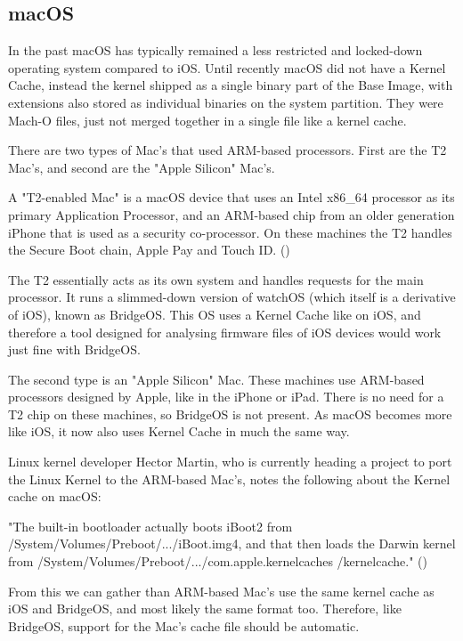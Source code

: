 \subsection{macOS}


In the past macOS has typically remained a less restricted and locked-down operating system compared to iOS. Until recently macOS did not have a Kernel Cache, instead the kernel shipped as a single binary part of the Base Image, with extensions also stored as individual binaries on the system partition. They were Mach-O files, just not merged together in a single file like a kernel cache.


There are two types of Mac's that used ARM-based processors. First are the T2 Mac's, and second are the "Apple Silicon" Mac's.

A "T2-enabled Mac" is a macOS device that uses an Intel x86\_64 processor as its primary Application Processor, and an ARM-based chip from an older generation iPhone that is used as a security co-processor. On these machines the T2 handles the Secure Boot chain, Apple Pay and Touch ID. (\cite{duo-labs-t2-intro})

The T2 essentially acts as its own system and handles requests for the main processor. It runs a slimmed-down version of watchOS (which itself is a derivative of iOS), known as BridgeOS. This OS uses a Kernel Cache like on iOS, and therefore a tool designed for analysing firmware files of iOS devices would work just fine with BridgeOS.

The second type is an "Apple Silicon" Mac. These machines use ARM-based processors designed by Apple, like in the iPhone or iPad. There is no need for a T2 chip on these machines, so BridgeOS is not present. As macOS becomes more like iOS, it now also uses Kernel Cache in much the same way. 

Linux kernel developer Hector Martin, who is currently heading a project to port the Linux Kernel to the ARM-based Mac's, notes the following about the Kernel cache on macOS:

"The built-in bootloader actually boots iBoot2 from /System/Volumes/Preboot/.../iBoot.img4, and that then loads the Darwin kernel from /System/Volumes/Preboot/.../com.apple.kernelcaches /kernelcache." (\cite{martin-hackernews-macos-kernel})

From this we can gather than ARM-based Mac's use the same kernel cache as iOS and BridgeOS, and most likely the same format too. Therefore, like BridgeOS, support for the Mac's cache file should be automatic. 

